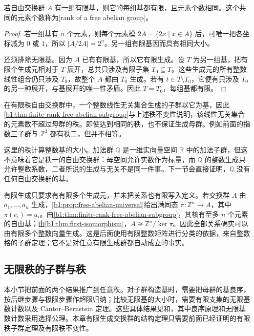 \begin{proposition}[有限秩不变性]\label{b1:prop:finite-rank-free-abelian}
	若自由交换群 \(A\) 有一组有限基，则它的每组基都有限，且元素个数相同。这个共同的元素个数称为[rank of a free abelian group]。
\end{proposition}

\begin{proof}
	若一组基有 \(n\) 个元素，则每个元素模 \(2A=\{2x\mid x\in A\}\) 后，可唯一把各坐标减为 \(0\) 或 \(1\)，所以 \(|A/2A|=2^n\)。另一组有限基因而具有相同大小。

	还须排除无限基。因为 \(A\) 已有有限基，所以它有限生成。设 \(T\) 为另一组基，把有限个生成元相对于 \(T\) 展开，总共只涉及有限子集 \(T_0\subseteq T\)。这些生成元的所有整数线性组合仍只涉及 \(T_0\)，故整个 \(A\) 都由 \(T_0\) 生成。若有 \(t\in T\setminus T_0\)，它便有只涉及 \(T_0\) 的另一种展开，与基展开的唯一性矛盾。因此 \(T=T_0\)，每组基都有限。
\end{proof}

在有限秩自由交换群中，一个整数线性无关集合生成的子群以它为基，因此\cref{b1:thm:finite-rank-free-abelian-subgroup}与上述秩不变性说明，该线性无关集合的元素数不超过母群的秩。即使达到相同的秩，也不保证生成母群。例如前面的指数三子群与 \(\mathbb Z^2\) 都有秩二，但并不相等。

\ProseParagraphBreak
这里的秩计算整数基的大小。加法群 \(\mathbb Q\) 是一维实向量空间 \(\mathbb R\) 中的加法子群，但这不意味着它是秩一的自由交换群：母空间允许实数作为标量，而 \(\mathbb Q\) 的整数生成只允许整数系数，二者所说的生成与无关不是同一件事。下一节会直接证明，\(\mathbb Q\) 没有任何自由交换群的基。

\ProseParagraphBreak
有限生成只要求有有限多个生成元，并未把关系也有限写入定义。若交换群 \(A\) 由 \(a_1,\ldots,a_n\) 生成，\cref{b1:prop:free-abelian-universal}给出满同态 \(\pi:\mathbb Z^n\to A\)，其中 \(\pi(e_i)=a_i\)。由\cref{b1:thm:finite-rank-free-abelian-subgroup}，其核有至多 \(n\) 个元素的自由基；由\cref{b1:thm:first-isomorphism}，\(A\cong\mathbb Z^n/\ker\pi\)。因此全部关系确实可以由有限多个整数向量生成。这是后面使用有限整数矩阵进行分类的依据，来自整数格的子群定理；它不是对任意有限生成群都自动成立的事实。

\subsection{无限秩的子群与秩}
\label{b1:subsec:0901:04}

本小节把前面的两个结果推广到任意秩。对子群构造基时，需要把母群的基良序，按后继步骤与极限步骤作超限归纳；比较无限基的大小时，需要有限支集的无限基数计数以及 Cantor--Bernstein 定理。这些具体结果见和，其中良序原理和无限基数计数采用选择公理。本章有限生成交换群的结构定理只需要前面已经证明的有限秩子群定理及有限秩不变性。

